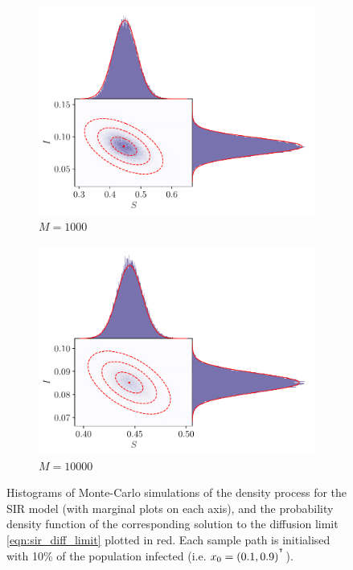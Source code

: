 \begin{figure}
\begin{center}
\begin{subfigure}{0.49\textwidth}
			\includegraphics[width=\textwidth]{chp06_applications/figures/sir/sir_pairwise_1000}
			\caption{\(M = 1000\)}
			\label{fig:sir_gauss_rels_3}
		\end{subfigure}\begin{subfigure}{0.49\textwidth}
			\includegraphics[width=\textwidth]{chp06_applications/figures/sir/sir_pairwise_10000}
			\caption{\(M = 10000\)}
			\label{fig:sir_gauss_rels_4}
		\end{subfigure}
		\caption{Histograms of Monte-Carlo simulations of the density process for the SIR model (with marginal plots on each axis), and the probability density function of the corresponding solution to the diffusion limit \cref{eqn:sir_diff_limit} plotted in red.
			Each sample path is initialised with 10\% of the population infected (i.e. \(x_0 = \left(0.1, 0.9\right)^{^{\intercal}}\)).}
		\label{fig:sir_gauss_rels}
	\end{center}
\end{figure}


